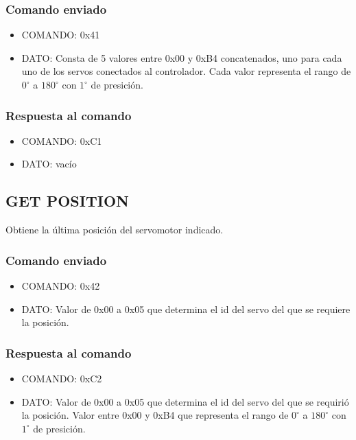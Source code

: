 \documentclass[a4paper,10pt]{article}
\begin{document}
\subsubsection*{Comando enviado}

\begin{itemize}
	\item{COMANDO:} 0x41
	\item{DATO:} Consta de 5 valores entre 0x00 y 0xB4 concatenados, uno para cada uno de los servos conectados al controlador.
	Cada valor representa el rango de $0^{\circ}$ a $180^{\circ}$ con $1^{\circ}$ de presici\'on.
\end{itemize}

\subsubsection*{Respuesta al comando}

\begin{itemize}
	\item{COMANDO:} 0xC1
	\item{DATO:} vac\'io
\end{itemize}

\subsection{GET POSITION}
\label{get_position}

Obtiene la \'ultima posici\'on del servomotor indicado.

\subsubsection*{Comando enviado}

\begin{itemize}
	\item{COMANDO:} 0x42
	\item{DATO:} Valor de 0x00 a 0x05 que determina el id del servo del que se requiere la posici\'on.
\end{itemize}

\subsubsection*{Respuesta al comando}

\begin{itemize}
	\item{COMANDO:} 0xC2
	\item{DATO:} Valor de 0x00 a 0x05 que determina el id del servo del que se requiri\'o la posici\'on.
	Valor entre 0x00 y 0xB4 que representa el rango de $0^{\circ}$ a $180^{\circ}$ con $1^{\circ}$ de presici\'on.
\end{itemize}
\end{document}
